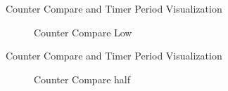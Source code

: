 \begin{frame}{Counter Compare and Timer Period Visualization}
	\begin{figure}
		\centering
		\caption{Counter Compare Low}
	\end{figure}
\end{frame}

\begin{frame}{Counter Compare and Timer Period Visualization}
	\begin{figure}
		\centering
		\caption{Counter Compare half}
	\end{figure}
\end{frame}


